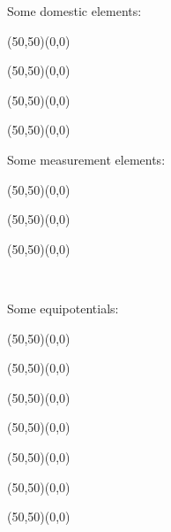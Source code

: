 	Some domestic elements:
	\vspace{1cm}
	\begin{center}
	\begin{picture}(50,50)(0,0)
	\end{picture}
	\begin{picture}(50,50)(0,0)
	\end{picture}
	\begin{picture}(50,50)(0,0)
	\end{picture}
	\begin{picture}(50,50)(0,0)
	\end{picture}
	\end{center}
	
	Some measurement elements:
	\vspace{1cm}
	\begin{center}
	\begin{picture}(50,50)(0,0)
	\end{picture}
	\begin{picture}(50,50)(0,0)
	\end{picture}
	\begin{picture}(50,50)(0,0)
	\end{picture}\\[1cm]
	\end{center}
	
	\pagebreak
	Some equipotentials:
	\vspace{1cm}
	\begin{center}
	\begin{picture}(50,50)(0,0)
	\end{picture}
	\begin{picture}(50,50)(0,0)
	\end{picture}
	\begin{picture}(50,50)(0,0)
	\end{picture}
	\begin{picture}(50,50)(0,0)
	\end{picture}
	\begin{picture}(50,50)(0,0)
	\end{picture}
	\begin{picture}(50,50)(0,0)
	\end{picture}
	\begin{picture}(50,50)(0,0)
	\end{picture}
	\end{center}
	
